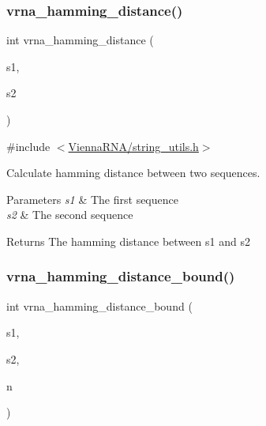 \subsubsection{\texorpdfstring{vrna\+\_\+hamming\+\_\+distance()}{vrna\_hamming\_distance()}}
{\footnotesize\ttfamily int vrna\+\_\+hamming\+\_\+distance (\begin{DoxyParamCaption}\item[{const char $\ast$}]{s1,  }\item[{const char $\ast$}]{s2 }\end{DoxyParamCaption})}



{\ttfamily \#include $<$\mbox{\hyperlink{string__utils_8h}{Vienna\+R\+N\+A/string\+\_\+utils.\+h}}$>$}



Calculate hamming distance between two sequences. 


\begin{DoxyParams}{Parameters}
{\em s1} & The first sequence \\
\hline
{\em s2} & The second sequence \\
\hline
\end{DoxyParams}
\begin{DoxyReturn}{Returns}
The hamming distance between s1 and s2 
\end{DoxyReturn}
\mbox{\label{group__string__utils_ga5d1c2271e79d9bcb52d4e68360763fb9}} 
\subsubsection{\texorpdfstring{vrna\+\_\+hamming\+\_\+distance\+\_\+bound()}{vrna\_hamming\_distance\_bound()}}
{\footnotesize\ttfamily int vrna\+\_\+hamming\+\_\+distance\+\_\+bound (\begin{DoxyParamCaption}\item[{const char $\ast$}]{s1,  }\item[{const char $\ast$}]{s2,  }\item[{int}]{n }\end{DoxyParamCaption})}



